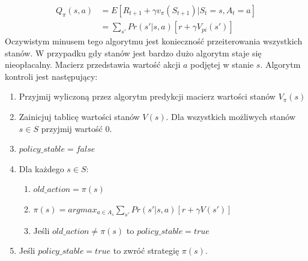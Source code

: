 \documentclass[12pt]{book}
\theoremstyle{plain}
\begin{document}
\begin{equation}
\begin{split}
Q_{\pi}(s,a) &= E[R_{t+1}+\gamma v_{\pi}(S_{t+1}) | S_t=s, A_t=a]  \\
&= \sum_{s'}Pr(s'|s,a)[r+\gamma V_{pi}(s')] 
\end{split}
\end{equation}
Oczywistym minusem tego algorytmu jest konieczność przeiterowania wszystkich stanów. W przypadku gdy stanów jest bardzo dużo algorytm staje się nieopłacalny.
Macierz przedstawia wartość akcji $a$ podjętej w stanie $s$. Algorytm kontroli jest następujący:
\begin{enumerate}
	\item{Przyjmij wyliczoną przez algorytm predykcji macierz wartości stanów $V_{\pi}(s)$}
	\item{Zainicjuj tablicę wartości stanów $V(s)$. Dla wszystkich możliwych stanów $s \in S$ przyjmij wartość $0$.}
	\item{$policy\_stable=false$}
	\item{Dla każdego $s \in S$:}
	\begin{enumerate}
		\item $old\_action=\pi(s)$
		\item $\pi(s)=argmax_{a\in A_s} \sum_{s'}Pr(s'|s,a)[r+\gamma V(s')]$
		\item Jeśli $old\_action \neq \pi(s)$ to $policy\_stable = true$
	\end{enumerate}
	\item Jeśli $policy\_stable=true$ to zwróć strategię $\pi(s)$.
\end{enumerate}
\end{document}
